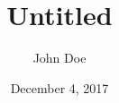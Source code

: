 \documentclass[a4paper,12pt]{article}
\author{John Doe}
\title{Untitled}
\date{December 4, 2017} %
\begin{document}
    \blindtext        %
\end{document}
